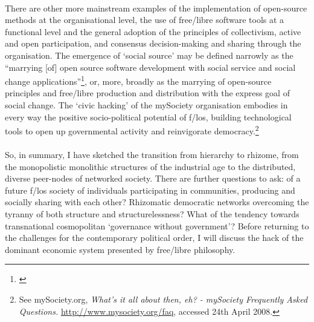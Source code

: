 \paragraph{}There are other more mainstream examples of the implementation of open-source methods at the organisational level, the use of free/libre software tools at a functional level and the general adoption of the principles of collectivism, active and open participation, and consensus decision-making and sharing through the organisation. The emergence of `social source' may be defined narrowly as the ``marrying [of] open source software development with social service and social change applications''\footnote{\cite{rosenblatt:2005mn}}, or, more, broadly as the marrying of open-source principles and free/libre production and distribution with the express goal of social change. The `civic hacking' of the mySociety organisation embodies in every way the positive socio-political potential of f/los, building technological tools to open up governmental activity and reinvigorate democracy.\footnote{See mySociety.org, \textit{What's it all about then, eh? - mySociety Frequently Asked Questions.} \url{http://www.mysociety.org/faq}, accessed 24th April 2008.}

\paragraph{}So, in summary, I have sketched the transition from hierarchy to rhizome, from the monopolistic monolithic structures of the industrial age to the distributed, diverse peer-nodes of networked society. There are further questions to ask: of a future f/los society of individuals participating in communities, producing and socially sharing with each other? Rhizomatic democratic networks overcoming the tyranny of both structure and structurelessness? What of the tendency towards transnational cosmopolitan `governance without government'? Before returning to the challenges for the contemporary political order, I will discuss the hack of the dominant economic system presented by free/libre philosophy.